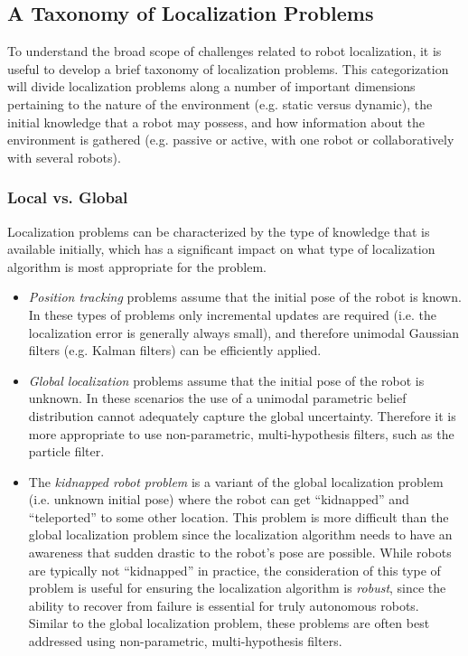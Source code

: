 \subsection{A Taxonomy of Localization Problems}
To understand the broad scope of challenges related to robot localization, it is useful to develop a brief taxonomy of localization problems. This categorization will divide localization problems along a number of important dimensions pertaining to the nature of the environment (e.g. static versus dynamic), the initial knowledge that a robot may possess, and how information about the environment is gathered (e.g. passive or active, with one robot or collaboratively with several robots).

\subsubsection{Local vs. Global}
Localization problems can be characterized by the type of knowledge that is available initially, which has a significant impact on what type of localization algorithm is most appropriate for the problem.

\begin{itemize}
    \item \textit{Position tracking} problems assume that the initial pose of the robot is known. In these types of problems only incremental updates are required (i.e. the localization error is generally always small), and therefore unimodal Gaussian filters (e.g. Kalman filters) can be efficiently applied.
    
    \item \textit{Global localization} problems assume that the initial pose of the robot is unknown. In these scenarios the use of a unimodal parametric belief distribution cannot adequately capture the global uncertainty. Therefore it is more appropriate to use non-parametric, multi-hypothesis filters, such as the particle filter.
    
    \item The \textit{kidnapped robot problem} is a variant of the global localization problem (i.e. unknown initial pose) where the robot can get ``kidnapped'' and ``teleported'' to some other location. This problem is more difficult than the global localization problem since the localization algorithm needs to have an awareness that sudden drastic to the robot's pose are possible. While robots are typically not ``kidnapped'' in practice, the consideration of this type of problem is useful for ensuring the localization algorithm is \textit{robust}, since the ability to recover from failure is essential for truly autonomous robots. Similar to the global localization problem, these problems are often best addressed using non-parametric, multi-hypothesis filters.
\end{itemize}


